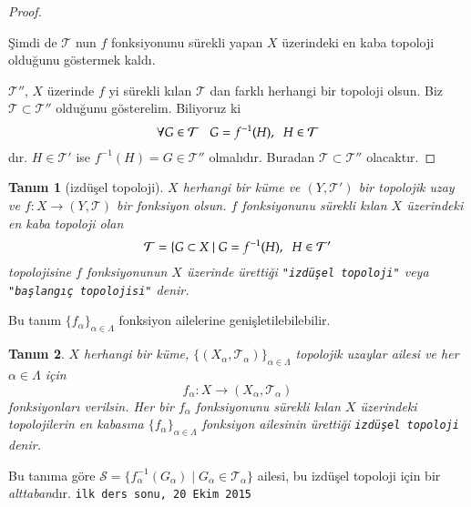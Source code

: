 \documentclass[11pt, a4paper]{article}
\newtheorem{tanim}{Tan{\i}m}
\begin{document}
\begin{proof}
\begin{enumerate}[label=(\roman*),leftmargin=1cm,series=lafter]
\c{S}imdi de $\mathcal{T}$ nun $f$ fonksiyonunu s\"{u}rekli yapan $X$ \"{u}zerindeki en kaba topoloji oldu\u{g}unu g\"{o}stermek kald{\i}.
\end{enumerate}

$\mathcal{T}''$, $X$ \"{u}zerinde $f$ yi s\"{u}rekli k{\i}lan $\mathcal{T}$ dan farkl{\i} herhangi bir topoloji olsun. Biz $\mathcal{T} \subset \mathcal{T}''$ oldu\u{g}unu g\"{o}sterelim. Biliyoruz ki $$\forall G\in \mathcal{T}\hspace{3mm} G=f^{-1}(H),\hspace{2mm} H\in \mathcal{T}$$
d{\i}r. $H\in \mathcal{T}'$ ise $f^{-1}(H)=G\in \mathcal{T}''$ olmal{\i}d{\i}r. Buradan $\mathcal{T}\subset \mathcal{T}''$ olacakt{\i}r.
\end{proof}

\begin{tanim}[izd\"{u}\c{s}el topoloji] $X$ herhangi bir k\"{u}me ve $(Y,\mathcal{T}')$ bir topolojik uzay ve $f:X\to (Y,\mathcal{T})$ bir fonksiyon olsun. $f$ fonksiyonunu s\"{u}rekli k{\i}lan $X$ \"{u}zerindeki en kaba topoloji olan $$\mathcal{T}=\{ G\subset X \mid G=f^{-1}(H), \hspace{2mm} H\in \mathcal{T}'$$ topolojisine $f$ fonksiyonunun $X$ \"{u}zerinde \"{u}retti\u{g}i \texttt{"izd\"{u}\c{s}el topoloji"} veya \texttt{"ba\c{s}lang{\i}\c{c} topolojisi"} denir.
\end{tanim}

Bu tan{\i}m $\{f_\alpha \}_{\alpha \in \Lambda}$ fonksiyon ailelerine geni\c{s}letilebilebilir.
\begin{tanim}
$X$ herhangi bir k\"{u}me, $\{ (X_\alpha, \mathcal{T}_\alpha) \}_{\alpha \in \Lambda}$ topolojik uzaylar ailesi ve her $\alpha \in \Lambda$ i\c{c}in $$ f_\alpha : X\to (X_\alpha, \mathcal{T}_\alpha) $$ fonksiyonlar{\i} verilsin. Her bir $f_\alpha$ fonksiyonunu s\"{u}rekli k{\i}lan $X$ \"{u}zerindeki topolojilerin en kabas{\i}na $\{ f_\alpha \}_{\alpha \in \Lambda}$ fonksiyon ailesinin \"{u}retti\u{g}i \texttt{izd\"{u}\c{s}el topoloji} denir.
\end{tanim}

Bu tan{\i}ma g\"{o}re $\mathcal{S}=\{ f^{-1}_\alpha(G_\alpha) \mid G_\alpha \in \mathcal{T}_\alpha \}$ ailesi, bu izd\"{u}\c{s}el topoloji i\c{c}in bir \emph{alttaban}dır. 
\vfill \hfill \texttt{ilk ders sonu, 20 Ekim 2015 }
\end{document}
